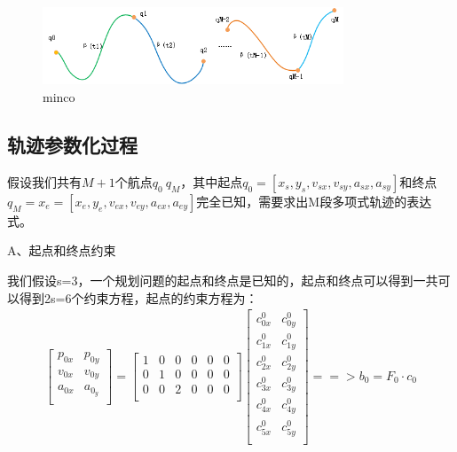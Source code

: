 \documentclass[master,academic]{ysuthesis} %
\begin{document}
		\begin{figure}[!ht]
			\centering
			\includegraphics[width=0.8\textwidth]{minco.png}
			\caption{minco}
			\label{fig:minco}
		\end{figure}
	
		\subsection{轨迹参数化过程}
		假设我们共有$M+1$个航点$q_0~q_M$，其中起点$q_0=[x_s,y_s,v_{sx},v_{sy},a_{sx},a_{sy}]$和终点$q_M=x_e=[x_e,y_e,v_{ex},v_{ey},a_{ex},a_{ey}]$完全已知，需要求出M段多项式轨迹的表达式。  
		   
			A、起点和终点约束    
			  
			我们假设s=3，一个规划问题的起点和终点是已知的，起点和终点可以得到一共可以得到2s=6个约束方程，起点的约束方程为：
			\begin{equation}
				\begin{aligned}
				\left[ \begin{matrix}
					p_{0x}&		p_{0y}\\
					v_{0x}&		v_{0y}\\
					a_{0x}&		a_{0_y}\\
				\end{matrix} \right] =\left[ \begin{matrix}
					1&		0&		0&		0&		0&		0\\
					0&		1&		0&		0&		0&		0\\
					0&		0&		2&		0&		0&		0\\
				\end{matrix} \right] \left[ \begin{matrix}
					c_{0x}^{0}&		c_{0y}^{0}\\
					c_{1x}^{0}&		c_{1y}^{0}\\
					c_{2x}^{0}&		c_{2y}^{0}\\
					c_{3x}^{0}&		c_{3y}^{0}\\
					c_{4x}^{0}&		c_{4y}^{0}\\
					c_{5x}^{0}&		c_{5y}^{0}\\
				\end{matrix} \right] ==>b_0=F_0\cdot c_0
				\end{aligned}
			\end{equation}
			
\end{document}
